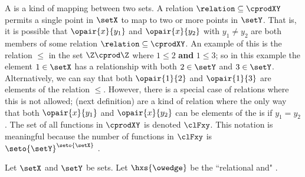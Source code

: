 A  is a kind of mapping between two sets.
A relation $\relation\subseteq \cprodXY$ permits
a single point in $\setX$ to map to two or more points in $\setY$.
That is, it is possible that $\opair{x}{y_1}$ and $\opair{x}{y_2}$ with $y_1\ne y_2$
are both members of some
relation $\relation\subseteq \cprodXY$.
An example of this is the relation $\le$ in the set $\Z\cprod\Z$ where
$1\le2$ {\bf and} $1\le3$; so in this example the element $1\in\setX$ has a
relationship with both $2\in\setY$ and $3\in\setY$.
Alternatively, we can say that both $\opair{1}{2}$ and $\opair{1}{3}$ are 
elements of the relation $\le$.
However, there is a special case of relations where this is not allowed;
 (next definition) are a kind of relation where
the only way that both $\opair{x}{y_1}$ and $\opair{x}{y_2}$ can be elements 
of the  is if $y_1=y_2$.
The set of all functions in $\cprodXY$ is denoted $\clFxy$.
This notation is meaningful because the number of functions in $\clFxy$ is
$\seto{\setY}^{\seto{\setX}}$ .
\begin{definition}
\label{def:fnd_f(x)}
Let $\setX$ and $\setY$ be sets.
Let $\hxs{\owedge}$ be the ``relational and" .
\end{definition}


